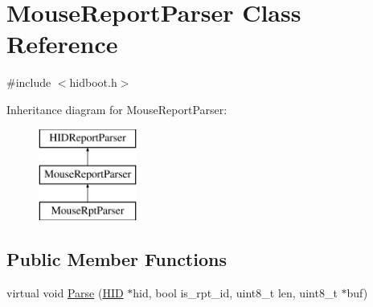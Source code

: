 \hypertarget{class_mouse_report_parser}{\section{\-Mouse\-Report\-Parser \-Class \-Reference}
\label{class_mouse_report_parser}
}


{\ttfamily \#include $<$hidboot.\-h$>$}

\-Inheritance diagram for \-Mouse\-Report\-Parser\-:\begin{figure}[H]
\begin{center}
\leavevmode
\includegraphics[height=3.000000cm]{class_mouse_report_parser}
\end{center}
\end{figure}
\subsection*{\-Public \-Member \-Functions}
\begin{DoxyCompactItemize}
\item 
virtual void \hyperlink{class_mouse_report_parser_a2dd4e0add7c902300de5e7250c6d6110}{\-Parse} (\hyperlink{class_h_i_d}{\-H\-I\-D} $\ast$hid, bool is\-\_\-rpt\-\_\-id, uint8\-\_\-t len, uint8\-\_\-t $\ast$buf)
\end{DoxyCompactItemize}
